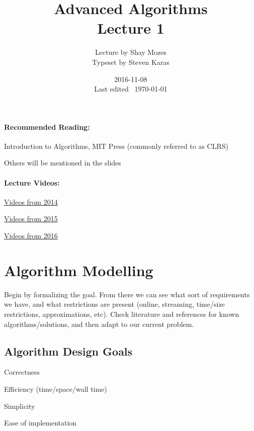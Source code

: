 \documentclass[a4paper]{article}
\title{Advanced Algorithms\\\large Lecture 1}
\date{2016-11-08 \\ Last edited \currenttime\ \today}
\author{Lecture by Shay Mozes\\Typeset by Steven Karas}
\newenvironment{itemize*}%
  {\begin{itemize}%
    \setlength{\itemsep}{0pt}%
    \setlength{\parsep}{0pt}%
    \setlength{\parskip}{0pt}}%
  {\end{itemize}}
\newenvironment{enumerate*}%
  {\begin{enumerate}%
    \setlength{\itemsep}{0.5pt}%
    \setlength{\parsep}{0pt}%
    \setlength{\parskip}{0pt}}%
  {\end{enumerate}}
\begin{document}
\maketitle

\paragraph{Recommended Reading:}

\begin{itemize*}
\item Introduction to Algorithms, MIT Press (commonly referred to as CLRS)
\item Others will be mentioned in the slides
\end{itemize*}

\paragraph{Lecture Videos:}

\begin{itemize*}
\item \href{http://www.faculty.idc.ac.il/smozes/advancedalgo/2014/index.html}{Videos from 2014}
\item \href{http://www.faculty.idc.ac.il/smozes/advancedalgo/index.html}{Videos from 2015}
\item \href{http://www.faculty.idc.ac.il/smozes/advancedalgo/2016/index.html}{Videos from 2016}
\end{itemize*}

\section{Algorithm Modelling}
Begin by formalizing the goal. From there we can see what sort of requirements we have, and what restrictions are present (online, streaming, time/size restrictions, approximations, etc). Check literature and references for known algorithms/solutions, and then adapt to our current problem.

\subsection{Algorithm Design Goals}

\begin{enumerate*}
\item Correctness
\item Efficiency (time/space/wall time)
\item Simplicity
\item Ease of implementation
\end{enumerate*}
\end{document}
